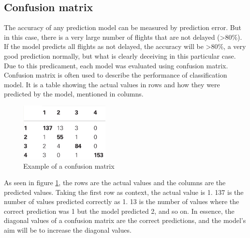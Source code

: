 \subsection{Confusion matrix}
The accuracy of any prediction model can be measured by prediction error. But in this case, there is a very large number of flights that are not delayed (>80\%). If the model predicts all flights as not delayed, the accuracy will be >80\%, a very good prediction normally, but what is clearly deceiving in this particular case. Due to this predicament, each model was evaluated using confusion matrix. Confusion matrix is often used to describe the performance of classification model. It is a table showing the actual values in rows and how they were predicted by the model, mentioned in columns. 

\begin{figure} 
\vspace{-20pt}
  \begin{center}
    \includegraphics[width=0.4\textwidth]{Figures/confusion_matrix_ex.png}
    \caption{Example of a confusion matrix}
    \label{fig:confusion_matrix_ex}
  \end{center}
  \vspace{-20pt}
  \vspace{1pt}
\end{figure} 

As seen in figure \ref{fig:confusion_matrix_ex}, the rows are the actual values and the columns are the predicted values. Taking the first row as context, the actual value is 1. 137 is the number of values predicted correctly as 1. 13 is the number of values where the correct prediction was 1 but the model predicted 2, and so on. In essence, the diagonal values of a confusion matrix are the correct predictions, and the model's aim will be to increase the diagonal values.

